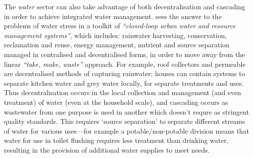 The \emph{water} sector can also take advantage of both decentralisation and cascading in order to achieve integrated water management. \citet[p. 809]{Daigger2009} sees the answer to the problems of water stress in a toolkit of \emph{``closed-loop urban water and resource management systems''}, which includes: rainwater harvesting, conservation, reclamation and reuse, energy management, nutrient and source separation managed in centralised and decentralised forms, in order to move away from the linear \emph{``take, make, waste''} approach. For example, roof collectors and permeable are decentralised methods of capturing rainwater; houses can contain systems to separate kitchen water and grey water locally, for separate treatments and uses. Thus decentralisation occurs in the local collection and management (and even treatment) of water (even at the household scale), and cascading occurs as wastewater from one purpose is used in another which doesn't requre as stringent quality standards. This requires `source separation' to separate different streams of water for various uses---for example a potable/non-potable division means that water for use in toilet flushing requires less treatment than drinking water, resulting in the provision of additional water supplies to meet needs.


